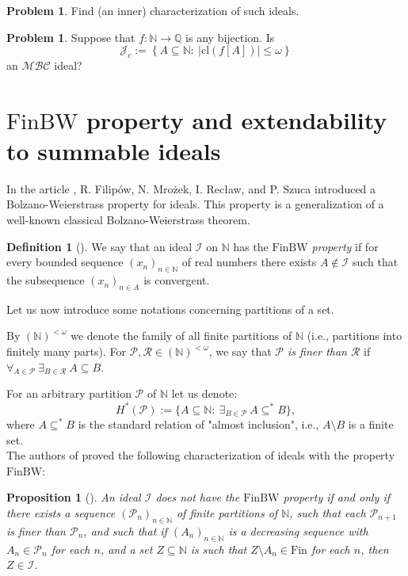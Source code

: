 \documentclass{amsart}
\newtheorem{prop}[thm]{Proposition}
\theoremstyle{definition}
\newtheorem{problem}[thm]{Problem}
\newtheorem{df}[thm]{Definition}
\newcommand{\N}{{\mathbb N}}
\newcommand{\Q}{{\mathbb Q}}
\newcommand{\Fin}{\textrm{Fin}}
\newcommand{\I}{\mathcal I}
\newcommand{\J}{\mathcal J}
\newcommand{\finbw}{\text{FinBW}}
\newcommand{\FinPart}{(\N)^{< \omega}}
\newcommand{\MBC}{\mathcal{MBC}}
\newcommand{\cl}{\mathrm{cl}}
\begin{document}
\begin{problem}
Find (an inner) characterization of such ideals.
\end{problem}

\begin{problem}
Suppose that $f\colon\N\to\Q$ is any bijection. Is 
$$\J_c :=\left\{A\subseteq \N :\ |\cl(f[A])| \leq \omega\right\}$$
an $\MBC$ ideal?
\end{problem}

  
\section{$\finbw$ property and extendability to summable ideals}		



In the article \cite{H1}, R. Filip\'ow, N. Mro\.zek, I. Rec\l{}aw, and P. Szuca introduced a Bolzano-Weierstrass property for ideals. This property is a generalization of a well-known classical Bolzano-Weierstrass theorem.

\begin{df}[\cite{H1}]
We say that an ideal $\I$ on $\N$ has the \emph{$\finbw$ property} if for every bounded sequence $(x_n)_{n\in\N}$ of real numbers there exists $A\notin\I$ such that the subsequence $(x_n)_{n\in A}$ is convergent.
\end{df}


Let us now introduce some notations concerning partitions of a set. 

By $\FinPart$ we denote the family of all finite partitions of $\N$ (i.e., partitions into finitely many parts). For $\mathcal{P}, \mathcal{R} \in \FinPart$, we say that \emph{$\mathcal{P}$ is finer than $\mathcal{R}$} if $\forall_{A \in \mathcal{P}}\ \exists_{B \in \mathcal{R}}\ A \subseteq B$.

For an arbitrary partition $\mathcal{P}$ of $\N$ let us denote: 
$$H^{*}(\mathcal{P}) := \{A\subseteq\N :\ \exists_{B\in\mathcal{P}}\ A\subseteq^{*} B\},$$ 
where $A\subseteq^{*} B$ is the standard relation of "almost inclusion", i.e., $A\setminus B$ is a finite set.\\

The authors of \cite{BFMS11} proved the following characterization of ideals with the property $\finbw$:

\begin{prop}[{\cite[Proposition 3]{BFMS11}}] \label{tree-fin-bw}
An ideal $\I$ does not have the $\finbw$ property if and only if there exists a sequence $(\mathcal{P}_n)_{n\in\N}$ of finite partitions of $\N$, such that each $\mathcal{P}_{n+1}$ is finer than $\mathcal{P}_n$, and such that if $(A_n)_{n\in\N}$ is a decreasing sequence with $A_n \in \mathcal{P}_n$ for each $n$, and a set $Z\subseteq\N$ is such that $Z\setminus A_n \in\Fin$ for each $n$, then $Z\in\I$.
\end{prop}
\end{document}
